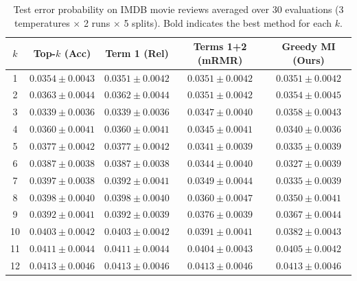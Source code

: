 \documentclass{article}
\theoremstyle{plain}
\theoremstyle{definition}
\theoremstyle{remark}
\begin{document}
\begin{table}[ht]
\centering
\caption{Test error probability on IMDB movie reviews averaged over 30 evaluations (3 temperatures $\times$ 2 runs $\times$ 5 splits). Bold indicates the best method for each $k$.}
\label{tab:imdb_results}
\small
\begin{tabular}{ccccc}
\toprule
$k$ & Top-$k$ (Acc) & Term 1 (Rel) & Terms 1+2 (mRMR) & Greedy MI (Ours) \\
\midrule
1  & $0.0354 \pm 0.0043$ & $0.0351 \pm 0.0042$ & $0.0351 \pm 0.0042$ & $0.0351 \pm 0.0042$ \\
2  & $0.0363 \pm 0.0044$ & $0.0362 \pm 0.0044$ & $0.0351 \pm 0.0042$ & $0.0354 \pm 0.0045$ \\
3  & $\mathbf{0.0339 \pm 0.0036}$ & $\mathbf{0.0339 \pm 0.0036}$ & $0.0347 \pm 0.0040$ & $0.0358 \pm 0.0043$ \\
4  & $0.0360 \pm 0.0041$ & $0.0360 \pm 0.0041$ & $0.0345 \pm 0.0041$ & $\mathbf{0.0340 \pm 0.0036}$ \\
5  & $0.0377 \pm 0.0042$ & $0.0377 \pm 0.0042$ & $0.0341 \pm 0.0039$ & $\mathbf{0.0335 \pm 0.0039}$ \\
6  & $0.0387 \pm 0.0038$ & $0.0387 \pm 0.0038$ & $0.0344 \pm 0.0040$ & $\mathbf{0.0327 \pm 0.0039}$ \\
7  & $0.0397 \pm 0.0038$ & $0.0392 \pm 0.0041$ & $0.0349 \pm 0.0044$ & $\mathbf{0.0335 \pm 0.0039}$ \\
8  & $0.0398 \pm 0.0040$ & $0.0398 \pm 0.0040$ & $0.0360 \pm 0.0047$ & $\mathbf{0.0350 \pm 0.0041}$ \\
9  & $0.0392 \pm 0.0041$ & $0.0392 \pm 0.0039$ & $0.0376 \pm 0.0039$ & $\mathbf{0.0367 \pm 0.0044}$ \\
10 & $0.0403 \pm 0.0042$ & $0.0403 \pm 0.0042$ & $0.0391 \pm 0.0041$ & $\mathbf{0.0382 \pm 0.0043}$ \\
11 & $0.0411 \pm 0.0044$ & $0.0411 \pm 0.0044$ & $\mathbf{0.0404 \pm 0.0043}$ & $0.0405 \pm 0.0042$ \\
12 & $0.0413 \pm 0.0046$ & $0.0413 \pm 0.0046$ & $0.0413 \pm 0.0046$ & $0.0413 \pm 0.0046$ \\
\bottomrule
\end{tabular}
\end{table}
\end{document}
